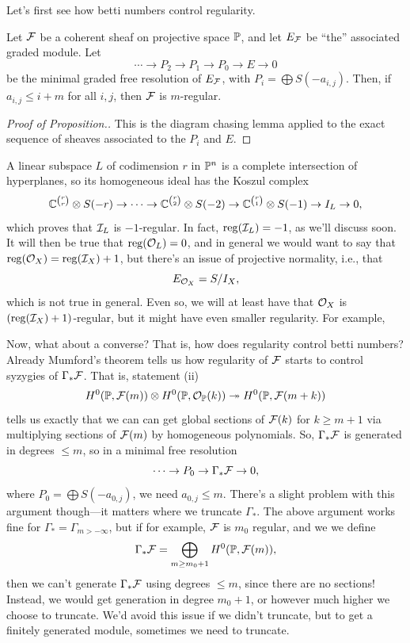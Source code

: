 \documentclass[12pt]{article}
\newcommand{\reg}{\mathrm{reg}}
\begin{document}
Let's first see how betti numbers control regularity.

\begin{prop} \label{betti-bound}
    Let $\cF$ be a coherent sheaf on projective space $\P$, and let $E_\cF$ be ``the'' associated graded module. Let
    \[\cdots \to P_2 \to P_1 \to P_0 \to E \to 0\]
    be the minimal graded free resolution of $E_\cF$, with $P_i = \bigoplus S(-a_{i,j})$. Then, if $a_{i,j}\leq i+m$ for all $i,j$, then $\cF$ is $m$-regular.
\end{prop}

\begin{proof}[Proof of Proposition.]
    This is the diagram chasing lemma applied to the exact sequence of sheaves associated to the $P_i$ and $E$.
\end{proof}

\begin{eg}
    A linear subspace $L$ of codimension $r$ in $\P^n$ is a complete intersection of hyperplanes, so its homogeneous ideal has the Koszul complex
    \[\C^{\binom{r}{r}} \otimes S(-r) \to \cdots \to \C^{\binom{r}{2}}\otimes S(-2) \to \C^{\binom{r}{1}} \otimes S(-1) \to I_L \to 0,\]
    which proves that $\cI_L$ is $-1$-regular. In fact, $\reg(\cI_L)=-1$, as we'll discuss soon. It will then be true that $\reg(\cO_L)=0$, and in general we would want to say that $\reg(\cO_X) = \reg(\cI_X)+1$, but there's an issue of projective normality, i.e., that
    \[E_{\cO_X} = S/I_X,\]
    which is not true in general. Even so, we will at least have that $\cO_X$ is $(\reg(\cI_X)+1)$-regular, but it might have even smaller regularity. For example, 
\end{eg}

Now, what about a converse? That is, how does regularity control betti numbers? Already Mumford's theorem tells us how regularity of $\cF$ starts to control syzygies of $\Gamma_* \cF$. That is, statement (ii)
\[H^0(\P, \cF(m)) \otimes H^0(\P, \cO_\P(k)) \twoheadrightarrow H^0(\P, \cF(m+k))\]
tells us exactly that we can can get global sections of $\cF(k)$ for $k\geq m+1$ via multiplying sections of $\cF(m)$ by homogeneous polynomials. So, $\Gamma_*\cF$ is generated in degrees $\leq m$, so in a minimal free resolution
\[\cdots \to P_0 \to \Gamma_* \cF \to 0,\]
where $P_0 = \bigoplus S(-a_{0,j})$, we need $a_{0,j}\leq m$. There's a slight problem with this argument though---it matters where we truncate $\Gamma_*$. The above argument works fine for $\Gamma_* = \Gamma_{m>-\infty}$, but if for example, $\cF$ is $m_0$ regular, and we we define
\[\Gamma_* \cF = \bigoplus_{m\geq m_0+1} H^0(\P,\cF(m)),\]
then we can't generate $\Gamma_* \cF$ using degrees $\leq m$, since there are no sections! Instead, we would get generation in degree $m_0+1$, or however much higher we choose to truncate. We'd avoid this issue if we didn't truncate, but to get a finitely generated module, sometimes we need to truncate.
\end{document}

